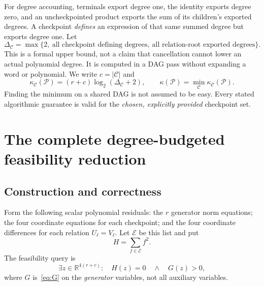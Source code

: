 \documentclass[11pt]{article}
\theoremstyle{definition}
\theoremstyle{remark}
\newcommand{\RR}{\mathbb R}
\newcommand{\calC}{\mathcal C}
\newcommand{\calP}{\mathcal P}
\begin{document}
For degree accounting, terminals export degree one, the identity exports degree zero, and an uncheckpointed product exports the sum of its children's exported degrees. A checkpoint \emph{defines} an expression of that same summed degree but exports degree one. Let
\begin{equation}
\Delta_{\calC}=\max\bigl\{2,\ \text{all checkpoint defining degrees},\
\text{all relation-root exported degrees}\bigr\}.
\label{eq:delta}
\end{equation}
This is a formal upper bound, not a claim that cancellation cannot lower an actual polynomial degree. It is computed in a DAG pass without expanding a word or polynomial. We write $c=|\calC|$ and
\begin{equation}
\kappa_{\calC}(\calP)=(r+c)\log_2(\Delta_{\calC}+2),\qquad
\kappa(\calP)=\min_{\calC}\kappa_{\calC}(\calP).
\label{eq:kappa}
\end{equation}
Finding the minimum on a shared DAG is not assumed to be easy. Every stated algorithmic guarantee is valid for the \emph{chosen, explicitly provided} checkpoint set.

\section{The complete degree-budgeted feasibility reduction}
\label{sec:generic}

\subsection{Construction and correctness}
Form the following scalar polynomial residuals: the $r$ generator norm equations; the four coordinate equations for each checkpoint; and the four coordinate differences for each relation $U_\ell=V_\ell$. Let $\mathcal E$ be this list and put
\begin{equation}
H=\sum_{f\in\mathcal E}f^2.
\label{eq:H}
\end{equation}
The feasibility query is
\begin{equation}
\exists z\in\RR^{4(r+c)}:\quad H(z)=0\quad\wedge\quad G(z)>0,
\label{eq:query}
\end{equation}
where $G$ is~\eqref{eq:G} on the \emph{generator} variables, not all auxiliary variables.
\end{document}
